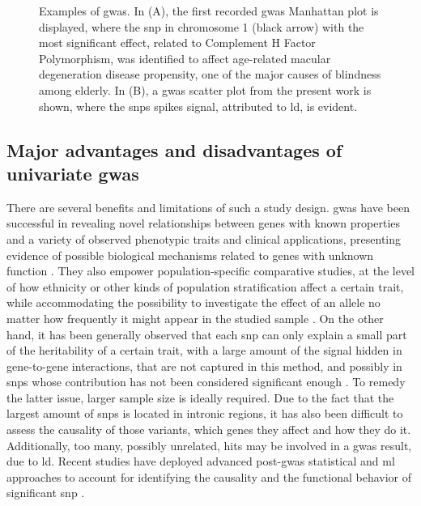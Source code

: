  \begin{figure}[H]
 	\centering
	\subfloat[]{
		
		\label{fig:gwas_example}
	}
	\caption[Examples of \acs{gwas} Manhattan plots \cite{Klein2005}]{Examples of \ac{gwas}. In (A), the first recorded \ac{gwas} Manhattan plot \cite{Klein2005} is displayed, where the \ac{snp} in chromosome 1 (black arrow) with the most significant  effect, related to Complement H Factor Polymorphism, was identified to affect age-related macular degeneration disease propensity, one of the major causes of blindness among elderly. In (B), a \ac{gwas} scatter plot from the present work is shown, where the \acp{snp} spikes signal, attributed to \ac{ld}, is evident.}
\end{figure}

\subsection{Major advantages and disadvantages of univariate \ac{gwas}}

There are several benefits and limitations of such a study design. \ac{gwas} have been successful in revealing novel relationships between genes with known properties and a variety of observed phenotypic traits and clinical applications, presenting evidence of possible biological mechanisms related to genes with unknown function \cite{Tam2019}. They also empower population-specific comparative studies, at the level of how ethnicity or other kinds of population stratification affect a certain trait, while accommodating the possibility to investigate the effect of an allele no matter how frequently it might appear in the studied sample \cite{Tam2019}. 
On the other hand, it has been generally observed  that each \ac{snp} can only explain a small part of the heritability of a certain trait, with a large amount of the signal hidden in gene-to-gene interactions, that are not captured in this method, and possibly in \acp{snp} whose contribution has not been considered significant enough  \cite{Tam2019}. To remedy the latter issue, larger sample size is ideally required. Due to the fact that the largest amount of \acp{snp} is located in intronic regions, it has also been difficult to assess the causality of those variants, which genes they affect and how they do it. Additionally, too many, possibly unrelated, hits may be involved in a \ac{gwas} result, due to \ac{ld}. \cite{Tam2019} Recent studies have deployed advanced post-\ac{gwas} statistical and \ac{ml} approaches to account for identifying the causality and the functional behavior of significant \ac{snp}  \cite{Nicholls2020,Gallagher2018}. 

